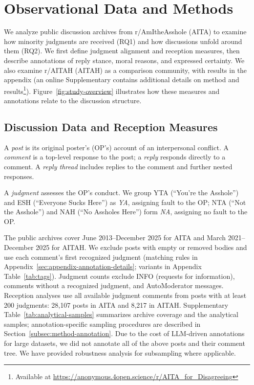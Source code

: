 \section{Observational Data and Methods}
\label{sec:data-method}

We analyze public discussion archives from r/AmItheAsshole (AITA) to
examine how minority judgments are received (RQ1) and how discussions unfold
around them (RQ2). We first define judgment alignment and
reception measures, then describe annotations of 
reply stance, moral reasons, and expressed certainty. We also examine r/AITAH (AITAH) as a comparison community,
with results in the appendix (an online Supplementary contains additional details on method and results\footnote{Available at \url{https://anonymous.4open.science/r/AITA_for_Disagreeing}}).
Figure~\ref{fig:study-overview}
illustrates how these measures and annotations relate to the discussion
structure. 



\subsection{Discussion Data and Reception Measures}
\label{subsec:dataset}

A \emph{post} is its original poster's (OP's) account of an interpersonal
conflict. A \emph{comment} is a top-level response to the post;
a \emph{reply} responds directly to a comment. A \emph{reply thread}
includes replies to the comment and further nested responses.

A \emph{judgment} assesses the OP's conduct. We group YTA
(``You're the Asshole'') and ESH (``Everyone Sucks Here'') as \emph{YA},
assigning fault to the OP; NTA (``Not the Asshole'') and NAH
(``No Assholes Here'') form \emph{NA}, assigning no fault to the OP.

The public archives cover June 2013--December 2025 for AITA and
March 2021--December 2025 for AITAH. We exclude posts with empty or
removed bodies and use each comment's first recognized judgment
(matching rules in Appendix~\ref{sec:appendix-annotation-details};
variants in Appendix Table~\ref{tab:tags}). Judgment counts exclude
INFO (requests for information), comments without a recognized judgment,
and AutoModerator messages. Reception analyses use all available
judgment comments from posts with at least 200 judgments: 28,107 posts
in AITA and 8,217 in AITAH. Supplementary
Table~\ref{tab:analytical-samples} summarizes archive coverage and the
analytical samples; annotation-specific sampling procedures are described
in Section~\ref{subsec:method-annotation}. 
Due to the cost of LLM-driven annotations for large datasets, we did not annotate all of the above posts and their comment tree. We have provided robustness analysis for subsampling where applicable.

